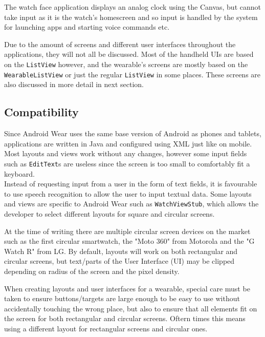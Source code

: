 The watch face application displays an analog clock using the Canvas, but cannot
take input as it is the watch's homescreen and so input is handled by the system
for launching apps and starting voice commands etc.

Due to the amount of screens and different user interfaces throughout the
applications, they will not all be discussed. Most of the handheld UIs are based
on the \texttt{ListView} however, and the wearable's screens are mostly based
on the \texttt{WearableListView} or just the regular \texttt{ListView} in some
places. These screens are also discussed in more detail in next section.

\subsection{Compatibility}
Since Android Wear uses the same base version of Android as phones and tablets,
applications are written in Java and configured using XML just like on mobile.
Most layouts and views work without any changes, however some input fields such
as \texttt{EditText}s are useless since the screen is too small to comfortably
fit a keyboard.\\
Instead of requesting input from a user in the form of text fields, it is
favourable to use speech recognition to allow the user to input textual data.
Some layouts and views are specific to Android Wear such as
\texttt{WatchViewStub}, which allows the developer to select different layouts
for square and circular screens.

At the time of writing there are multiple circular screen devices on the market
such as the first circular smartwatch, the "Moto 360" from Motorola and the "G
Watch R" from LG. By default, layouts will work on both rectangular and
circular screens, but text/parts of the User Interface (UI) may be clipped
depending on radius of the screen and the pixel density.

When creating layouts and user interfaces for a wearable, special care must be
taken to ensure buttons/targets are large enough to be easy to use without
accidentally touching the wrong place, but also to ensure that all elements fit
on the screen for both rectangular and circular screens. Oftern times this means
using a different layout for rectangular screens and circular ones.
